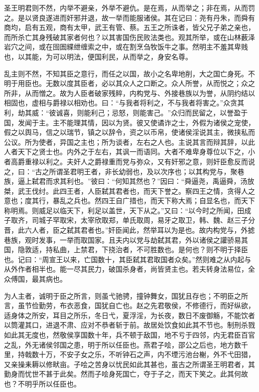 \documentclass[]{article}
\begin{document}
圣王明君则不然，内举不避亲，外举不避仇。是在焉，从而举之；非在焉，从而罚之。是以贤良遂进而奸邪并退，故一举而能服诸侯。其在记曰：尧有丹朱，而舜有商均，启有五观，商有太甲，武王有管、蔡。五王之所诛者，皆父兄子弟之亲也，而所杀亡其身残破其家者何也？以其害国伤民败法类也。观其所举，或在山林薮泽岩穴之间，或在囹圄緤绁缠索之中，或在割烹刍牧饭牛之事。然明主不羞其卑贱也，以其能，为可以明法，便国利民，从而举之，身安名尊。

乱主则不然，不知其臣之意行，而任之以国，故小之名卑地削，大之国亡身死。不明于用臣也。无数以度其臣者，必以其众人之口断之。众人所誉，从而悦之；众之所非，从而憎之。故为人臣者破家残賥，内构党与、外接巷族以为誉，从阴约结以相固也，虚相与爵禄以相劝也。曰：``与我者将利之，不与我者将害之。''众贪其利，劫其威：``彼诚喜，则能利己；忌怒，则能害己。''众归而民留之，以誉盈于国，发闻于主。主不能理其情，因以为贤。彼又使谲诈之士，外假为诸侯之宠使，假之以舆马，信之以瑞节，镇之以辞令，资之以币帛，使诸侯淫说其主，微挟私而公议。所为使者，异国之主也；所为谈者，左右之人也。主说其言而辩其辞，以此人者天下之贤士也。内外之于左右，其讽一而语同。大者不难卑身尊位以下之，小者高爵重禄以利之。夫奸人之爵禄重而党与弥众，又有奸邪之意，则奸臣愈反而说之，曰：``古之所谓圣君明王者，非长幼弱也，及以次序也；以其构党与，聚巷族，逼上弑君而求其利也。''彼曰：``何知其然也？''因曰：``舜逼尧，禹逼舜，汤放桀，武王伐纣。此四王者，人臣弑其君者也，而天下誉之。察四王之情，贪得人之意也；度其行，暴乱之兵也。然四王自广措也，而天下称大焉；自显名也，而天下称明焉。则威足以临天下，利足以盖世，天下从之。''又曰：``以今时之所闻，田成子取齐，司城子罕取宋，太宰欣取郑，单氏取周，易牙之取卫，韩、魏、赵三子分晋，此六人者，臣之弑其君者也。''奸臣闻此，然举耳以为是也。故内构党与，外摅巷族，观时发事，一举而取国家。且夫内以党与劫弑其君，外以诸侯之讙骄易其国，隐敦适，持私曲，上禁君，下挠治者，不可胜数也。是何也？则不明于择臣也。记曰：``周宣王以来，亡国数十，其臣弑其君取国者众矣。''然则难之从内起与从外作者相半也。能一尽其民力，破国杀身者，尚皆贤主也。若夫转身法易位，全众傅国，最其病也。

为人主者，诚明于臣之所言，则虽弋驰骋，撞钟舞女，国犹且存也；不明臣之所言，虽节俭勤劳，布衣恶食，国犹自亡也。赵之先君敬侯，不修德行，而好纵欲，适身体之所安，耳目之所乐，冬日弋，夏浮淫，为长夜，数日不废御觞，不能饮者以筒灌其口，进退不肃、应对不恭者斩于前。故居处饮食如此其不节也。制刑杀戮如此其无度也，然敬侯享国数十年，兵不顿于敌国，地不亏于四邻，内无君臣百官之乱，外无诸侯邻国之患，明于所以任臣也。燕君子哙，邵公之后也，地方数千里，持戟数十万，不安子女之乐，不听钟石之声，内不堙污池台榭，外不弋田猎，又亲操耒耨以修畎亩。子哙之苦身以忧民如此其甚也，虽古之所谓圣王明君者，其勤身而忧世不甚于此矣。然而子哙身死国亡，夺于子之，而天下笑之。此其何故也？不明乎所以任臣也。
\end{document}
